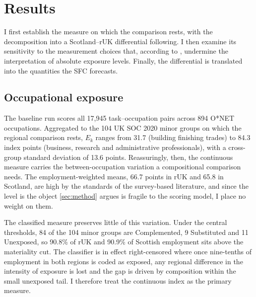 \section{Results}\label{sec:results}

I first establish the measure on which the comparison rests, with the decomposition into a Scotland--rUK differential following. I then examine its sensitivity to the measurement choices that, according to \citet{yin2026}, undermine the interpretation of absolute exposure levels. Finally, the differential is translated into the quantities the SFC forecasts.

\subsection{Occupational exposure}\label{sec:saturation}
 
The baseline run scores all 17,945 task--occupation pairs across 894 O*NET occupations. Aggregated to the 104 UK SOC 2020 minor groups on which the regional comparison rests, $E_k$ ranges from 31.7 (building finishing trades) to 84.3 index points (business, research and administrative professionals), with a cross-group standard deviation of 13.6 points. Reassuringly, then, the continuous measure carries the between-occupation variation a compositional comparison needs. The employment-weighted means, 66.7 points in rUK and 65.8 in Scotland, are high by the standards of the survey-based literature, and since the level is the object \cref{sec:method} argues is fragile to the scoring model, I place no weight on them.
 
The classified measure preserves little of this variation. Under the central thresholds, 84 of the 104 minor groups are Complemented, 9 Substituted and 11 Unexposed, so 90.8\% of rUK and 90.9\% of Scottish employment sits above the materiality cut. The classifier is in effect right-censored where once nine-tenths of employment in both regions is coded as exposed, any regional difference in the intensity of exposure is lost and the gap is driven by composition within the small unexposed tail. I therefore treat the continuous index as the primary measure.

